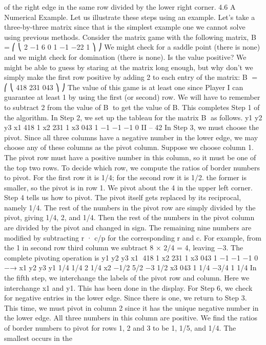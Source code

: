 \documentclass[]{report}
\begin{document}
of the right edge in the same row divided by the lower right corner.
4.6 A Numerical Example. Let us illustrate these steps using an example. Let’s
take a three-by-three matrix since that is the simplest example one we cannot solve using
previous methods. Consider the matrix game with the following matrix,
B =
⎛
⎝
2 −1 6
0 1 −1
−22 1
⎞
⎠
We might check for a saddle point (there is none) and we might check for domination
(there is none). Is the value positive? We might be able to guess by staring at the matrix
long enough, but why don’t we simply make the first row positive by adding 2 to each
entry of the matrix:
B =
⎛
⎝
418
231
043
⎞
⎠
The value of this game is at least one since Player I can guarantee at least 1 by using the
first (or second) row. We will have to remember to subtract 2 from the value of B to get
the value of B. This completes Step 1 of the algorithm.
In Step 2, we set up the tableau for the matrix B as follows.
y1 y2 y3
x1 418 1
x2 231 1
x3 043 1
−1 −1 −1 0
II – 42
In Step 3, we must choose the pivot. Since all three columns have a negative number
in the lower edge, we may choose any of these columns as the pivot column. Suppose we
choose column 1. The pivot row must have a positive number in this column, so it must be
one of the top two rows. To decide which row, we compute the ratios of border numbers
to pivot. For the first row it is 1/4; for the second row it is 1/2. the former is smaller, so
the pivot is in row 1. We pivot about the 4 in the upper left corner.
Step 4 tells us how to pivot. The pivot itself gets replaced by its reciprocal, namely
1/4. The rest of the numbers in the pivot row are simply divided by the pivot, giving 1/4,
2, and 1/4. Then the rest of the numbers in the pivot column are divided by the pivot and
changed in sign. The remaining nine numbers are modified by subtracting r · c/p for the
corresponding r and c. For example, from the 1 in second row third column we subtract
8 × 2/4 = 4, leaving −3. The complete pivoting operation is
y1 y2 y3
x1 418 1
x2 231 1
x3 043 1
−1 −1 −1 0
−→
x1 y2 y3
y1 1/4 1/4 2 1/4
x2 −1/2 5/2 −3 1/2
x3 043 1
1/4 −3/4 1 1/4
In the fifth step, we interchange the labels of the pivot row and column. Here we
interchange x1 and y1. This has been done in the display.
For Step 6, we check for negative entries in the lower edge. Since there is one, we
return to Step 3.
This time, we must pivot in column 2 since it has the unique negative number in the
lower edge. All three numbers in this column are positive. We find the ratios of border
numbers to pivot for rows 1, 2 and 3 to be 1, 1/5, and 1/4. The smallest occurs in the
\end{document}

